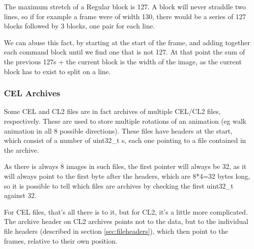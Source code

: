 \documentclass[a4paper]{article}
\begin{document}
 	The maximum stretch of a Regular block is 127. A block will never straddle two lines, so if for example a frame were of width 130, there would be a series of 127 blocks followed by 3 blocks, one pair for each line.
 	
 	We can abuse this fact, by starting at the start of the frame, and adding together each command block until we find one that is not 127. At that point the sum of the previous 127s + the current block is the width of the image, as the current block has to exist to split on a line.
 	
 	\subsubsection{CEL Archives}
 	Some CEL and CL2 files are in fact archives of multiple CEL/CL2 files, respectively. These are used to store multiple rotations of an animation (eg walk animation in all 8 possible directions). These files have headers at the start, which consist of a number of uint32\_t s, each one pointing to a file contained in the archive.
 	
 	As there is always 8 images in such files, the first pointer will always be 32, as it will always point to the first byte after the headers, which are 8*4=32 bytes long, so it is possible to tell which files are archives by checking the first uint32\_t against 32.
 	
 	For CEL files, that's all there is to it, but for CL2, it's a little more complicated. The archive header on CL2 archives points not to the data, but to the individual file headers (described in section \ref{sec:fileheaders}), which then point to the frames, relative to their own position.
\newpage



\end{document}
